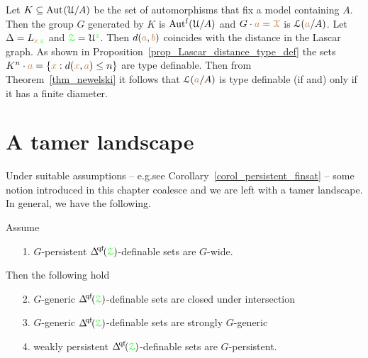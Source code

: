 

\begin{example}\label{ex_newelski}
  Let $K\subseteq{\rm Aut\kern.15ex}(\EuScript U/A)$ be the set of automorphisms that fix a model containing $A$.
  Then the group $G$  generated by $K$ is $\mbox{Aut$^{\rm f}$}(\EuScript U/A)$ and $G\cdot{\color{brown}a}={\color{brown}\EuScript X}$ is $\EuScript L({\color{brown} a}/A)$.
  Let $\Delta=L_{{\color{brown} x}\,{\color{green} z}}$ and ${\color{green}\EuScript Z}=\EuScript U^{\color{green} z}$.
  Then $d({\color{brown} a},{\color{brown} b})$ coincides with the distance in the Lascar graph.
  As shown in Proposition~\ref{prop_Lascar_distance_type_def} the sets $K^n\cdot{\color{brown}a}=\{{\color{brown} x}:d({\color{brown} x},{\color{brown} a})\le n\}$ are type definable.
  Then from Theorem~\ref{thm_newelski} it follows that $\EuScript L({\color{brown} a}/A)$ is type definable (if and) only if it has a finite diameter.
\end{example} 

\section{A tamer landscape}\label{tame_landscape}

Under suitable assumptions -- e.g.\@ see Corollary~\ref{corol_persistent_finsat} -- some  notion introduced in this chapter coalesce and we are left with a tamer landscape.
In general, we have the following.


\begin{theorem}\label{thm_coalesce}
  Assume 
  \begin{itemize}
    \item[1.] $G$-persistent $\qfDelta({\grZ})$-definable sets are $G$-wide.
  \end{itemize}
  Then the following hold
  \begin{itemize}
    \item[2.] $G$-generic $\qfDelta({\grZ})$-definable sets are closed under intersection 
    \item[3.] $G$-generic $\qfDelta({\grZ})$-definable sets are strongly $G$-generic
    \item[4.] weakly persistent $\qfDelta({\grZ})$-definable sets are $G$-persistent.
  \end{itemize}
\end{theorem}

